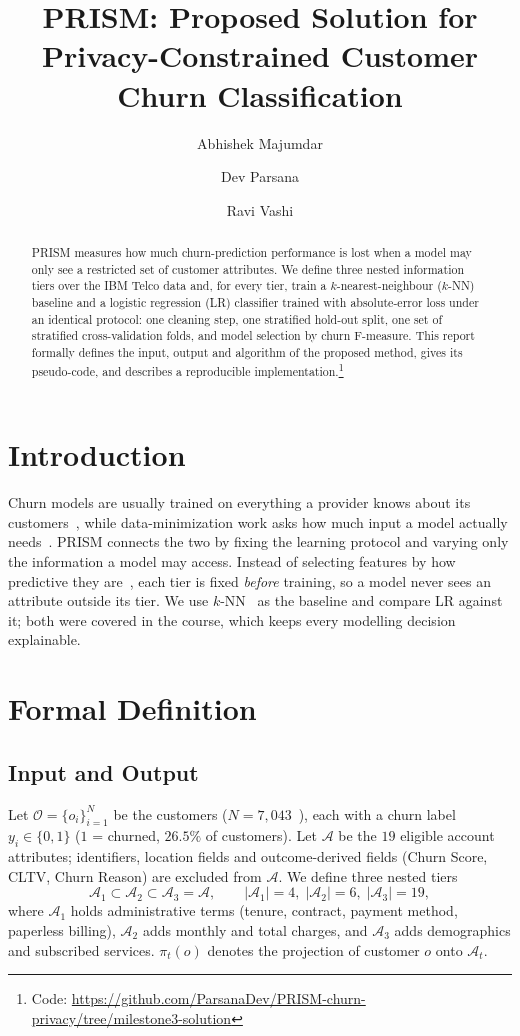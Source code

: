 \documentclass[sigconf,nonacm]{acmart}
\title{PRISM: Proposed Solution for Privacy-Constrained Customer Churn Classification}
\author{Abhishek Majumdar}
\affiliation{\institution{University of Victoria}\city{Victoria}\country{Canada}}
\author{Dev Parsana}
\affiliation{\institution{University of Victoria}\city{Victoria}\country{Canada}}
\author{Ravi Vashi}
\affiliation{\institution{University of Victoria}\city{Victoria}\country{Canada}}
\begin{document}
\begin{abstract}
PRISM measures how much churn-prediction performance is lost when a model may only see a restricted set of customer attributes. We define three nested information tiers over the IBM Telco data and, for every tier, train a $k$-nearest-neighbour ($k$-NN) baseline and a logistic regression (LR) classifier trained with absolute-error loss under an identical protocol: one cleaning step, one stratified hold-out split, one set of stratified cross-validation folds, and model selection by churn F-measure. This report formally defines the input, output and algorithm of the proposed method, gives its pseudo-code, and describes a reproducible implementation.\footnote{Code: \url{https://github.com/ParsanaDev/PRISM-churn-privacy/tree/milestone3-solution}}
\end{abstract}
\maketitle

\section{Introduction}
Churn models are usually trained on everything a provider knows about its customers~\cite{mozer,neslin}, while data-minimization work asks how much input a model actually needs~\cite{goldsteen}. PRISM connects the two by fixing the learning protocol and varying only the information a model may access. Instead of selecting features by how predictive they are~\cite{omari}, each tier is fixed \emph{before} training, so a model never sees an attribute outside its tier. We use $k$-NN~\cite{coverhart} as the baseline and compare LR against it; both were covered in the course, which keeps every modelling decision explainable.

\section{Formal Definition}
\subsection{Input and Output}
Let $\mathcal{O}=\{o_i\}_{i=1}^{N}$ be the customers ($N=7{,}043$~\cite{ibmtelco}), each with a churn label $y_i\in\{0,1\}$ ($1$ = churned, $26.5\%$ of customers). Let $\mathcal{A}$ be the $19$ eligible account attributes; identifiers, location fields and outcome-derived fields (Churn Score, CLTV, Churn Reason) are excluded from $\mathcal{A}$. We define three nested tiers
\begin{equation*}
\mathcal{A}_1\subset\mathcal{A}_2\subset\mathcal{A}_3=\mathcal{A},\qquad |\mathcal{A}_1|=4,\;|\mathcal{A}_2|=6,\;|\mathcal{A}_3|=19,
\end{equation*}
where $\mathcal{A}_1$ holds administrative terms (tenure, contract, payment method, paperless billing), $\mathcal{A}_2$ adds monthly and total charges, and $\mathcal{A}_3$ adds demographics and subscribed services. $\pi_t(o)$ denotes the projection of customer $o$ onto $\mathcal{A}_t$.
\end{document}
